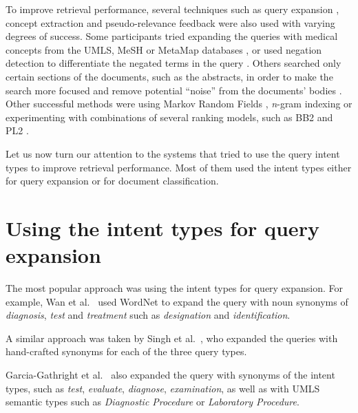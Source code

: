 To improve retrieval performance, several techniques such as
query expansion \cite{mutrec, sankhavara2014fusing, cuhk, CSEIITV, ucla, udel, duth, ir.cs.sfsu, goodwin2014utd, oh2014kisti},
concept extraction \cite{ir.cs.sfsu, ucla, bitem, goodwin2014utd, oh2014kisti}
and pseudo-relevance feedback \cite{novasearch, waterloo, mutrec, oh2014kisti, choi, dinh2014crp}
were also used with varying degrees of success. 
Some participants tried expanding the queries with medical concepts
from the UMLS, MeSH or MetaMap databases \cite{lamda2015, ucla, udel, bitem, novasearch}, 
or used negation detection to differentiate the negated terms in the query
\cite{wing2014query, wei2014atigeo, ucla, oh2014kisti}.
Others searched only certain sections of the documents, such as the abstracts, in order to make the search more focused
and remove potential ``noise'' from the documents' bodies \cite{ucla}.
Other successful methods were using Markov Random Fields \cite{wsuir},
\emph{n}-gram indexing \cite{xu2014hltcoe}
or experimenting with combinations of several ranking models,
such as BB2 and PL2 \cite{song2015ecnu}.

Let us now turn our attention to the systems that tried to use the query intent types to improve retrieval performance.
Most of them used the intent types either for query expansion or for document classification.

\section{Using the intent types for query expansion}

The most popular approach was using the intent types for query expansion. 
For example, Wan et al.\ \cite{cuhk} used WordNet to expand the query with noun synonyms
of \emph{diagnosis}, \emph{test} and \emph{treatment} such as \emph{designation} and \emph{identification}.

A similar approach was taken by Singh et al.\ \cite{CSEIITV}, who expanded the queries with hand-crafted synonyms
for each of the three query types.

Garcia-Gathright et al.\ \cite{ucla} also expanded the query with synonyms of the intent types, such as \emph{test}, \emph{evaluate},
\emph{diagnose}, \emph{examination}, as well as with UMLS semantic types such as \emph{Diagnostic Procedure}
or \emph{Laboratory Procedure}. 

